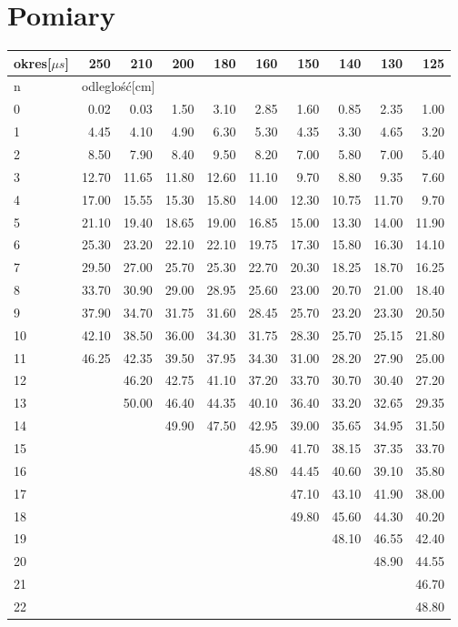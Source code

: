 \documentclass[a4paper,10pt]{article}
\begin{document}
\section{Pomiary}
\begin{tabular}{lrrrrrrrrr}
okres[$\mu s$] & 250 & 210 & 200 & 180 & 160 & 150 & 140 & 130 & 125 \\\hline
  n   & \multicolumn{9}{l}{odleglość[cm]} \\\hline
  0   & 0.02 & 0.03 & 1.50 & 3.10 & 2.85 & 1.60 & 0.85 & 2.35 & 1.00 \\
  1   & 4.45 & 4.10 & 4.90 & 6.30 & 5.30 & 4.35 & 3.30 & 4.65 & 3.20 \\
  2   & 8.50 & 7.90 & 8.40 & 9.50 & 8.20 & 7.00 & 5.80 & 7.00 & 5.40 \\
  3   &12.70 &11.65 &11.80 &12.60 &11.10 & 9.70 & 8.80 & 9.35 & 7.60 \\
  4   &17.00 &15.55 &15.30 &15.80 &14.00 &12.30 &10.75 &11.70 & 9.70 \\
  5   &21.10 &19.40 &18.65 &19.00 &16.85 &15.00 &13.30 &14.00 &11.90 \\
  6   &25.30 &23.20 &22.10 &22.10 &19.75 &17.30 &15.80 &16.30 &14.10 \\
  7   &29.50 &27.00 &25.70 &25.30 &22.70 &20.30 &18.25 &18.70 &16.25 \\
  8   &33.70 &30.90 &29.00 &28.95 &25.60 &23.00 &20.70 &21.00 &18.40 \\
  9   &37.90 &34.70 &31.75 &31.60 &28.45 &25.70 &23.20 &23.30 &20.50 \\
  10  &42.10 &38.50 &36.00 &34.30 &31.75 &28.30 &25.70 &25.15 &21.80 \\
  11  &46.25 &42.35 &39.50 &37.95 &34.30 &31.00 &28.20 &27.90 &25.00 \\
  12  &&46.20&42.75 &41.10 &37.20 &33.70 &30.70 &30.40 &27.20 \\
  13  &&50.00&46.40 &44.35 &40.10 &36.40 &33.20 &32.65 &29.35 \\
  14  &&&49.90&47.50&42.95 &39.00 &35.65 &34.95 &31.50 \\
  15  &&&&&45.90&41.70&38.15&37.35&33.70 \\
  16  &&&&&48.80&44.45&40.60&39.10&35.80 \\
  17  &&&&&&47.10&43.10&41.90&38.00 \\
  18  &&&&&&49.80&45.60&44.30&40.20 \\
  19  &&&&&&&48.10&46.55&42.40 \\
  20  &&&&&&&&48.90 &44.55 \\
  21  &&&&&&&&&46.70 \\
  22  &&&&&&&&&48.80
\end{tabular}
\end{document}
